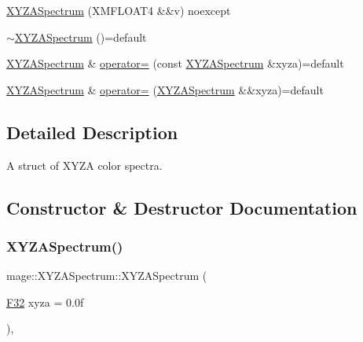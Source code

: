 \begin{DoxyCompactItemize}
\item 
\hyperlink{structmage_1_1_x_y_z_a_spectrum_a1f070e38017938a45880952a4df8c8d5}{X\+Y\+Z\+A\+Spectrum} (X\+M\+F\+L\+O\+A\+T4 \&\&v) noexcept
\item 
\hyperlink{structmage_1_1_x_y_z_a_spectrum_ac50d94c9756b6e8c1ff611dc37fbcfbf}{$\sim$\+X\+Y\+Z\+A\+Spectrum} ()=default
\item 
\hyperlink{structmage_1_1_x_y_z_a_spectrum}{X\+Y\+Z\+A\+Spectrum} \& \hyperlink{structmage_1_1_x_y_z_a_spectrum_a19cd04808e18b2791307195c54846988}{operator=} (const \hyperlink{structmage_1_1_x_y_z_a_spectrum}{X\+Y\+Z\+A\+Spectrum} \&xyza)=default
\item 
\hyperlink{structmage_1_1_x_y_z_a_spectrum}{X\+Y\+Z\+A\+Spectrum} \& \hyperlink{structmage_1_1_x_y_z_a_spectrum_a7afaa89a90d8444691b74c1f4b257aec}{operator=} (\hyperlink{structmage_1_1_x_y_z_a_spectrum}{X\+Y\+Z\+A\+Spectrum} \&\&xyza)=default
\end{DoxyCompactItemize}


\subsection{Detailed Description}
A struct of X\+Y\+ZA color spectra. 

\subsection{Constructor \& Destructor Documentation}
\hypertarget{structmage_1_1_x_y_z_a_spectrum_a5c9fd9e9a7feb1e2f2dff90241d666de}{}\label{structmage_1_1_x_y_z_a_spectrum_a5c9fd9e9a7feb1e2f2dff90241d666de} 
\subsubsection{\texorpdfstring{X\+Y\+Z\+A\+Spectrum()}{XYZASpectrum()}\hspace{0.1cm}{\footnotesize\ttfamily [1/10]}}
{\footnotesize\ttfamily mage\+::\+X\+Y\+Z\+A\+Spectrum\+::\+X\+Y\+Z\+A\+Spectrum (\begin{DoxyParamCaption}\item[{\hyperlink{namespacemage_aa97e833b45f06d60a0a9c4fc22ae02c0}{F32}}]{xyza = {\ttfamily 0.0f} }\end{DoxyParamCaption})\hspace{0.3cm}{\ttfamily [explicit]}, {\ttfamily [noexcept]}}

